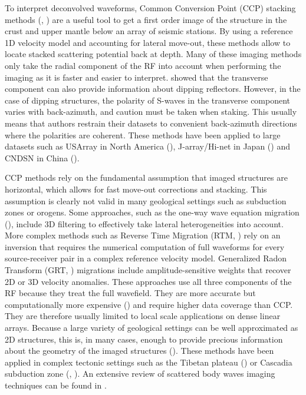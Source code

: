 \documentclass[9pt,a4paper]{article}
\numberwithin{equation}{section}
\begin{document}
\begin{multicols}{2}
To interpret deconvolved waveforms, Common Conversion Point (CCP) stacking methods (\cite{tess_gpro_88}, \cite{duek_jgr_97}) are a useful tool to get a first order image of the structure in the crust and upper mantle below an array of seismic stations.
By using a reference 1D velocity model and accounting for lateral move-out, these methods allow to locate stacked scattering potential back at depth.
Many of these imaging methods only take the radial component of the RF into account when performing the imaging as it is faster and easier to interpret.
\cite{tone_epsl_08} showed that the transverse component can also provide information about dipping reflectors.
However, in the case of dipping structures, the polarity of S-waves in the transverse component varies with back-azimuth, and caution must be taken when staking.
This usually means that authors restrain their datasets to convenient back-azimuth directions where the polarities are coherent. 
These methods have been applied to large datasets such as USArray in North America (\cite{leva_ggg_12}), J-array/Hi-net in Japan (\cite{yama_eps_03}) and CNDSN in China (\cite{chen_jgr_10}).

CCP methods rely on the fundamental assumption that imaged structures are horizontal, which allows for fast move-out corrections and stacking. 
This assumption is clearly not valid in many geological settings such as subduction zones or orogens. 
Some approaches, such as the one-way wave equation migration (\cite{chen_jgr_05}), include 3D filtering to effectively take lateral heterogeneities into account. 
More complex methods such as Reverse Time Migration (RTM, \cite{burd_gji_13}) rely on an inversion that requires the numerical computation of full waveforms for every source-receiver pair in a complex reference velocity model. 
Generalized Radon Transform (GRT, \cite{bost_jgr_01}) migrations include amplitude-sensitive weights that recover 2D or 3D velocity anomalies. 
These approaches use all three components of the RF because they treat the full wavefield. 
They are more accurate but computationally more expensive (\cite{rond_sgeo_09}) and require higher data coverage than CCP. 
They are therefore usually limited to local scale applications on dense linear arrays. 
Because a large variety of geological settings can be well approximated as 2D structures, this is, in many cases, enough to provide precious information about the geometry of the imaged structures (\cite{pear_jgr_12}). 
These methods have been applied in complex tectonic settings such as the Tibetan plateau (\cite{shan_gji_17}) or Cascadia subduction zone (\cite{rond_jgr_01}, \cite{aber_geol_09}).
An extensive review of scattered body waves imaging techniques can be found in \cite{rond_sgeo_09}.


\end{multicols}
\end{document}
